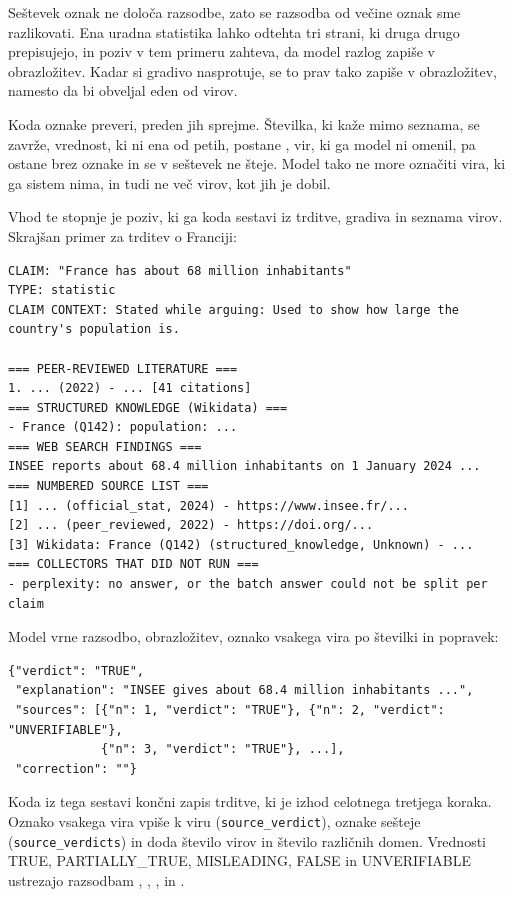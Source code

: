 \documentclass[a4paper, 12pt]{book}
\begin{document}
Seštevek oznak ne določa razsodbe, zato se razsodba od večine oznak sme razlikovati. Ena uradna statistika lahko odtehta tri strani, ki druga drugo prepisujejo, in poziv v tem primeru zahteva, da model razlog zapiše v obrazložitev. Kadar si gradivo nasprotuje, se to prav tako zapiše v obrazložitev, namesto da bi obveljal eden od virov.

Koda oznake preveri, preden jih sprejme. Številka, ki kaže mimo seznama, se zavrže, vrednost, ki ni ena od petih, postane , vir, ki ga model ni omenil, pa ostane brez oznake in se v seštevek ne šteje. Model tako ne more označiti vira, ki ga sistem nima, in tudi ne več virov, kot jih je dobil.

Vhod te stopnje je poziv, ki ga koda sestavi iz trditve, gradiva in seznama virov. Skrajšan primer za trditev o Franciji:

\begin{lstlisting}[basicstyle=\ttfamily\scriptsize,breaklines=true]
CLAIM: "France has about 68 million inhabitants"
TYPE: statistic
CLAIM CONTEXT: Stated while arguing: Used to show how large the
country's population is.

=== PEER-REVIEWED LITERATURE ===
1. ... (2022) - ... [41 citations]
=== STRUCTURED KNOWLEDGE (Wikidata) ===
- France (Q142): population: ...
=== WEB SEARCH FINDINGS ===
INSEE reports about 68.4 million inhabitants on 1 January 2024 ...
=== NUMBERED SOURCE LIST ===
[1] ... (official_stat, 2024) - https://www.insee.fr/...
[2] ... (peer_reviewed, 2022) - https://doi.org/...
[3] Wikidata: France (Q142) (structured_knowledge, Unknown) - ...
=== COLLECTORS THAT DID NOT RUN ===
- perplexity: no answer, or the batch answer could not be split per claim
\end{lstlisting}

\noindent Model vrne razsodbo, obrazložitev, oznako vsakega vira po številki in popravek:

\begin{lstlisting}[basicstyle=\ttfamily\scriptsize,breaklines=true]
{"verdict": "TRUE",
 "explanation": "INSEE gives about 68.4 million inhabitants ...",
 "sources": [{"n": 1, "verdict": "TRUE"}, {"n": 2, "verdict": "UNVERIFIABLE"},
             {"n": 3, "verdict": "TRUE"}, ...],
 "correction": ""}
\end{lstlisting}

Koda iz tega sestavi končni zapis trditve, ki je izhod celotnega tretjega koraka. Oznako vsakega vira vpiše k viru (\texttt{source\_verdict}), oznake sešteje (\texttt{source\_verdicts}) in doda število virov in število različnih domen. Vrednosti TRUE, PARTIALLY\_TRUE, MISLEADING, FALSE in UNVERIFIABLE ustrezajo razsodbam , , ,  in .
\end{document}
